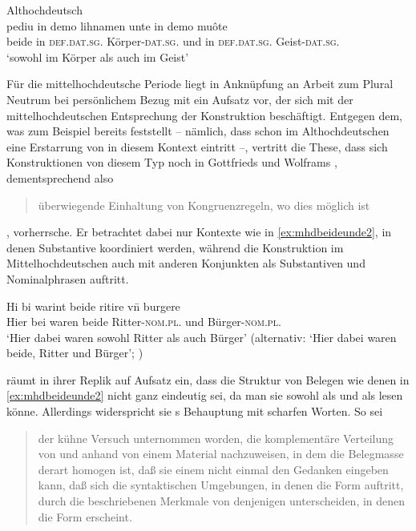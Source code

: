 \begin{exe}
\ex \label{ex:beideintiahd_3}
	\langinfo%
		{Althochdeutsch}
		{}
		{\cite[APB\_PredigtsammlungB, 1732--1739]{ddd}}\\
	\gll pediu in demo lihnamen unte in demo muôte \\
		beide in \textsc{def.dat.sg.\MascI} Körper-\textsc{dat.sg.\MascI} und in
			\textsc{def.dat.sg.\MascI} Geist-\textsc{dat.sg.\MascI} \\
	\trans `sowohl im Körper als auch im Geist'
\end{exe}

Für die mittelhochdeutsche Periode liegt in Anknüpfung an
 Arbeit zum Plural Neutrum bei persönlichem Bezug mit
\citet{askedal1974} ein Aufsatz vor, der sich mit der mittelhochdeutschen
Entsprechung der Konstruktion  beschäftigt. Entgegen
dem, was zum Beispiel bereits \citet[433--434]{behaghel1923} feststellt --
nämlich, dass schon im Althochdeutschen eine Erstarrung von  in
diesem Kontext eintritt --, vertritt \citeauthor{askedal1974} die These, dass
sich Konstruktionen von diesem Typ noch in Gottfrieds
\nocite{maroldschroeder1969} und Wolframs
\nocite{lachmannhartl1952} ,
dementsprechend also \blockcquote[37]{askedal1974}{überwiegende Einhaltung von
Kongruenzregeln, wo dies möglich ist}, vorherrsche. Er betrachtet dabei nur
Kontexte wie in \cref{ex:mhdbeideunde2}, in denen Substantive koordiniert
werden, während die Konstruktion im Mittelhochdeutschen auch mit anderen
Konjunkten als Substantiven und Nominalphrasen auftritt.

\begin{exe}
\ex\label{ex:mhdbeideunde2}
	\gll Hi bi warint beide ritire vn̄ burgere \\
		Hier bei waren beide Ritter-\textsc{nom.pl.\MascM} und
			Bürger-\textsc{nom.pl.\MascA} \\
	\trans %
		`Hier dabei waren sowohl Ritter als auch Bürger' (alternativ: `Hier
		dabei waren beide, Ritter und Bürger'; \cites(Nr.~N~321, Rosheim,
		Dépt.~Bas-Rhin, 1286)[245,29]{cao5})
\end{exe}

\citet[187]{gjelsten1980} räumt in ihrer Replik auf 
Aufsatz ein, dass die Struktur von Belegen wie denen in \cref{ex:mhdbeideunde2}
nicht ganz eindeutig sei, da man sie sowohl als  und als
 lesen könne. Allerdings widerspricht sie
\citeauthor{askedal1974}s Behauptung mit scharfen Worten. So sei
\blockcquote[196]{gjelsten1980}{der kühne Versuch unternommen worden, die
komplementäre Verteilung von  und  anhand von einem
Material nachzuweisen, in dem die Belegmasse derart homogen ist, daß sie einem
nicht einmal den Gedanken eingeben kann, daß sich die syntaktischen Umgebungen,
in denen die Form  auftritt, durch die beschriebenen Merkmale von
denjenigen unterscheiden, in denen die Form  erscheint.}

